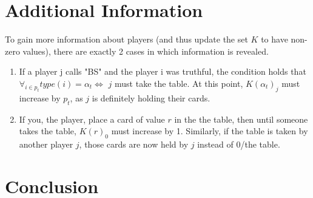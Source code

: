 \documentclass[a4paper,11pt]{article}
\begin{document}
\section{Additional Information}
To gain more information about players (and thus update the set $K$ to have non-zero values), there are exactly 2 cases in which information is revealed.

\begin{enumerate}
	\item If a player j calls "BS" and the player i was truthful, the condition holds that $\forall_{i\in p_t} type(i) = \alpha_t \iff $ $j$ must take the table. At this point, $K(\alpha_t)_j$ must increase by $p_t$, as $j$ is definitely holding their cards. 
	\item If you, the player, place a card of value $r$ in the the table, then until someone takes the table, $K(r)_0$ must increase by 1. Similarly, if the table is taken by another player $j$, those cards are now held by $j$ instead of $0$/the table. 
	
\end{enumerate} 
\section{Conclusion}
\end{document}
